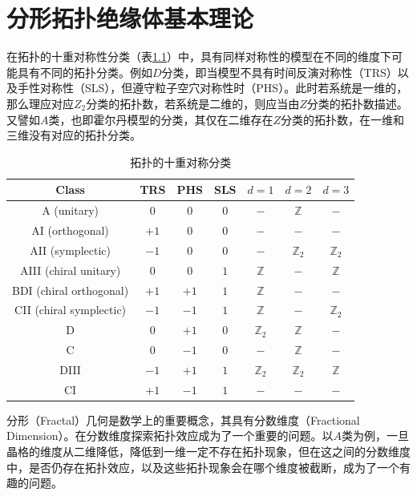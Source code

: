\chapter{分形拓扑绝缘体基本理论}
在拓扑的十重对称性分类（表\ref{tab:tenfold}）中，具有同样对称性的模型在不同的维度下可能具有不同的拓扑分类。例如$D$分类，即当模型不具有时间反演对称性（TRS）以及手性对称性（SLS），但遵守粒子空穴对称性时（PHS）。此时若系统是一维的，那么理应对应$Z_2$分类的拓扑数，若系统是二维的，则应当由$Z$分类的拓扑数描述。又譬如$A$类，也即霍尔丹模型的分类，其仅在二维存在$Z$分类的拓扑数，在一维和三维没有对应的拓扑分类。

\begin{table}[h!]
\centering
\begin{tabular}{|c|c|c|c|c|c|c|}
\hline
Class & TRS & PHS & SLS & $d=1$ & $d=2$ & $d=3$ \\ \hline
A (unitary) & $0$ & $0$ & $0$ & $-$ & $\mathbb{Z}$ & $-$ \\ \hline
AI (orthogonal) & $+1$ & $0$ & $0$ & $-$ & $-$ & $-$ \\ \hline
AII (symplectic) & $-1$ & $0$ & $0$ & $-$ & $\mathbb{Z}_2$ & $\mathbb{Z}_2$ \\ \hline
AIII (chiral unitary) & $0$ & $0$ & $1$ & $\mathbb{Z}$ & $-$ & $\mathbb{Z}$ \\ \hline
BDI (chiral orthogonal) & $+1$ & $+1$ & $1$ & $\mathbb{Z}$ & $-$ & $-$ \\ \hline
CII (chiral symplectic) & $-1$ & $-1$ & $1$ & $\mathbb{Z}$ & $-$ & $\mathbb{Z}_2$ \\ \hline
D & $0$ & $+1$ & $0$ & $\mathbb{Z}_2$ & $\mathbb{Z}$ & $-$ \\ \hline
C & $0$ & $-1$ & $0$ & $-$ & $\mathbb{Z}$ & $-$ \\ \hline
DIII & $-1$ & $+1$ & $1$ & $\mathbb{Z}_2$ & $\mathbb{Z}_2$ & $\mathbb{Z}$ \\ \hline
CI & $+1$ & $-1$ & $1$ & $-$ & $-$ & $-$ \\ \hline
\end{tabular}
\caption{拓扑的十重对称分类}
\label{tab:tenfold}
\end{table}

分形（Fractal）几何是数学上的重要概念，其具有分数维度（Fractional Dimension）。在分数维度探索拓扑效应成为了一个重要的问题。以$A$类为例，一旦晶格的维度从二维降低，降低到一维一定不存在拓扑现象，但在这之间的分数维度中，是否仍存在拓扑效应，以及这些拓扑现象会在哪个维度被截断，成为了一个有趣的问题。
